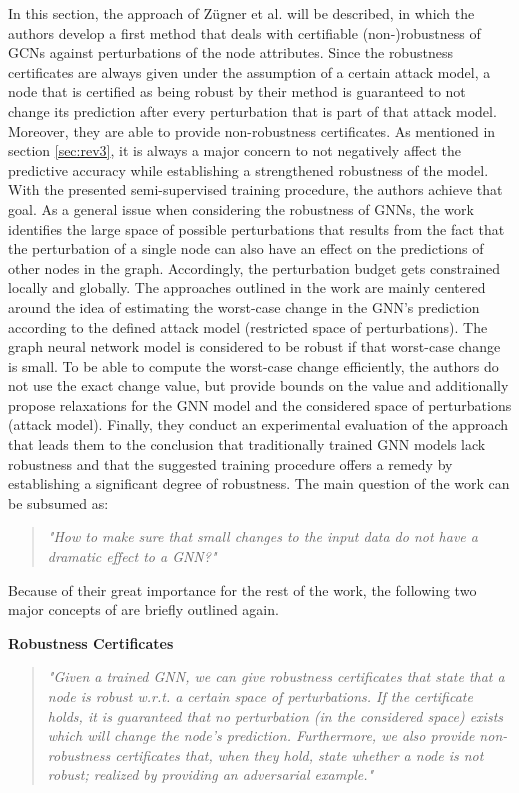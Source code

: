 \documentclass[a4paper,preprint]{sig-alternate}
\begin{document}
In this section, the approach of Zügner et al. \cite{Zuegner_2019} will be described,
in which the authors develop a first method that deals with certifiable (non-)robustness of GCNs against perturbations of
the node attributes. Since the robustness certificates are always given under the assumption of a certain attack model,
a node that is certified as being robust by their method is guaranteed to not change its prediction after every perturbation that is
part of that attack model. Moreover, they are able to provide non-robustness certificates.
As mentioned in section \ref{sec:rev3}, it is always a major concern to not negatively affect the predictive accuracy 
while establishing a strengthened robustness of the model. With the presented semi-supervised training procedure, the authors achieve that goal.
As a general issue when considering the robustness of GNNs, the work identifies the large space of possible perturbations
that results from the fact that the perturbation of a single node can also have an effect on the predictions of other nodes in the graph.
Accordingly, the perturbation budget gets constrained locally and globally.
The approaches outlined in the work are mainly centered around the idea of estimating the worst-case change in the GNN's prediction according
to the defined attack model (restricted space of perturbations). The graph neural network model is considered to be robust
if that worst-case change is small.
To be able to compute the worst-case change efficiently, the authors do not use the exact change value, but provide bounds on the value
and additionally propose relaxations for the GNN model and the considered space of perturbations (attack model). 
Finally, they conduct an experimental evaluation of the approach that leads them to the conclusion that 
traditionally trained GNN models lack robustness and that the suggested training procedure offers a remedy by establishing
a significant degree of robustness. The main question of the work can be subsumed as:
\begin{quote}
    \emph{"How to make sure that small changes to the input data do not have a dramatic effect to a GNN?"} \cite{Zuegner_2019}
\end{quote}
Because of their great importance for the rest of the work, the following two major concepts of \cite{Zuegner_2019} are briefly 
outlined again.

\vfill
\pagebreak

\textbf{Robustness Certificates}
\begin{quote}
    \emph{"Given a trained GNN, we can give robustness certificates that state that a node is robust w.r.t. a certain space of perturbations. 
    If the certificate holds, it is guaranteed that no perturbation (in the considered space) exists which will change the node's prediction. 
    Furthermore, we also provide non-robustness certificates that, when they hold, state whether a node is not robust; realized by providing 
    an adversarial example."} \cite{Zuegner_2019}
\end{quote}
\end{document}
